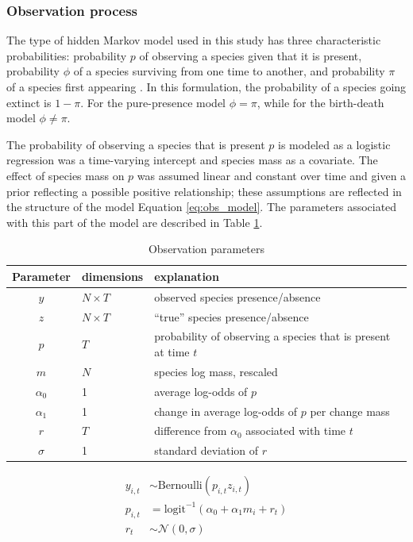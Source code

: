 \documentclass[12pt,letterpaper]{article}
\begin{document}
\subsubsection*{Observation process}
The type of hidden Markov model used in this study has three characteristic probabilities: probability \(p\) of observing a species given that it is present, probability \(\phi\) of a species surviving from one time to another, and probability \(\pi\) of a species first appearing \citep{Royle2008}. In this formulation, the probability of a species going extinct is \(1 - \pi\). For the pure-presence model \(\phi = \pi\), while for the birth-death model \(\phi \neq \pi\).

The probability of observing a species that is present \(p\) is modeled as a logistic regression was a time-varying intercept and species mass as a covariate. The effect of species mass on \(p\) was assumed linear and constant over time and given a prior reflecting a possible positive relationship; these assumptions are reflected in the structure of the model Equation \ref{eq:obs_model}. The parameters associated with this part of the model are described in Table \ref{tab:obs_param}.

\begin{table}
  \centering
  \caption{Observation parameters}
  \begin{tabular}{c l l}
    Parameter & dimensions & explanation \\
    \hline
    \(y\) & \(N \times T\) & observed species presence/absence \\
    \(z\) & \(N \times T\) & ``true'' species presence/absence \\
    \(p\) & \(T\) & probability of observing a species that is present at time \(t\) \\
    \(m\) & \(N\) & species log mass, rescaled \\
    \(\alpha_{0}\) & 1 & average log-odds of \(p\) \\ %
    \(\alpha_{1}\) & 1 & change in average log-odds of \(p\) per change mass \\
    \(r\) & \(T\) & difference from \(\alpha_{0}\) associated with time \(t\) \\
    \(\sigma\) & 1 & standard deviation of \(r\) \\
  \end{tabular}
  \label{tab:obs_param}
\end{table}

\begin{equation}
  \begin{aligned}
    y_{i, t} &\sim \text{Bernoulli}(p_{i, t} z_{i, t}) \\
    p_{i, t} &= \text{logit}^{-1}(\alpha_{0} + \alpha_{1} m_{i} + r_{t}) \\ 
    r_{t} &\sim \mathcal{N}(0, \sigma) \\
  \end{aligned}
  \label{eq:obs_model}
\end{equation}
\end{document}
